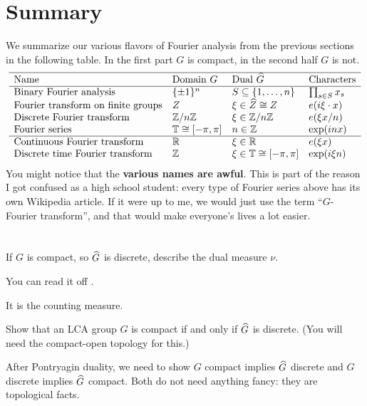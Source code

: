 \section{Summary}
We summarize our various flavors of Fourier analysis
from the previous sections in the following table.
In the first part $G$ is compact,
in the second half $G$ is not.
\[
	\begin{array}{llll}
		\hline
		\text{Name} & \text{Domain }G & \text{Dual }\widehat G 
			& \text{Characters} \\ \hline
		\text{Binary Fourier analysis} & \{\pm1\}^n
			& S \subseteq \left\{ 1, \dots, n \right\}
			& \prod_{s \in S} x_s \\
		\text{Fourier transform on finite groups} & Z
			& \xi \in \widehat Z \cong Z & e( i \xi \cdot x) \\
		\text{Discrete Fourier transform} & \mathbb Z/n\mathbb Z & \xi \in \mathbb Z/n\mathbb Z
			& e(\xi x / n) \\
		\text{Fourier series} & \mathbb T \cong [-\pi, \pi]  & n \in \mathbb Z
			& \exp(inx) \\ \hline
		\text{Continuous Fourier transform} & \mathbb R & \xi \in \mathbb R
		 	& e(\xi x) \\
		\text{Discrete time Fourier transform} & \mathbb Z & \xi \in \mathbb T \cong [-\pi, \pi]
		 	& \exp(i \xi n) \\
	\end{array}
\]
You might notice that the \textbf{various names are awful}.
This is part of the reason I got confused as a high school student:
every type of Fourier series above has its own Wikipedia article.
If it were up to me, we would just use the term ``$G$-Fourier transform'',
and that would make everyone's lives a lot easier.



\section{\problemhead}
\begin{problem}
	If $G$ is compact, so $\widehat G$ is discrete,
	describe the dual measure $\nu$.
	\begin{hint}
		You can read it off .
	\end{hint}
	\begin{sol}
		It is the counting measure.
	\end{sol}
\end{problem}

\begin{problem}
	\label{prob:LCA_compact}
	Show that an LCA group $G$ is compact
	if and only if $\widehat G$ is discrete.
	(You will need the compact-open topology for this.)
	\begin{hint}
		After Pontryagin duality,
		we need to show $G$ compact implies $\widehat G$ discrete
		and $G$ discrete implies $\widehat G$ compact.
		Both do not need anything fancy:
		they are topological facts.
	\end{hint}
\end{problem}

